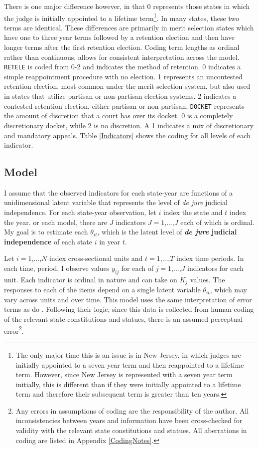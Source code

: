 \documentclass[12pt]{article}
\begin{document}
There is one major difference however, in that 0 represents those states in which the judge is initially appointed to a lifetime term\footnote{The only major time this is an issue is in New Jersey, in which judges are initially appointed to a seven year term and then reappointed to a lifetime term.  However, since New Jersey is represented with a seven year term initially, this is different than if they were initially appointed to a lifetime term and therefore their subsequent term is greater than ten years.}.  In many states, these two terms are identical.  These differences are primarily in merit selection states which have one to three year terms followed by a retention election and then have longer terms after the first retention election.  Coding term lengths as ordinal rather than continuous, allows for consistent interpretation across the model.  \texttt{RETELE} is coded from 0-2 and indicates the method of retention.  0 indicates a simple reappointment procedure with no election.  1 represents an uncontested retention election, most common under the merit selection system, but also used in states that utilize partisan or non-partisan election systems.  2 indicates a contested retention election, either partisan or non-partisan.  \texttt{DOCKET} represents the amount of discretion that a court has over its docket.  0 is a completely discretionary docket, while 2 is no discretion.  A 1 indicates a mix of discretionary and mandatory appeals. Table \ref{Indicators} shows the coding for all levels of each indicator. 

\subsection*{Model}
I assume that the observed indicators for each state-year are functions of a unidimensional latent variable that represents the level of \textit{de jure} judicial independence.  For each state-year observation, let $i$ index the state and $t$ index the year.  or each model, there are $J$ indicators $J=1$,...,$J$ each of which is ordinal. My goal is to estimate each $\theta_{it}$, which is the latent level of \textbf{\textit{de jure} judicial independence} of each state $i$ in year $t$.

Let $i=1$,...,$N$ index cross-sectional units and $t=1$,...,$T$ index time periods.  In each time, period, I observe values $y_{ij}$ for each of $j=1$,...,$J$ indicators for each unit.  Each indicator is ordinal in nature and can take on $K_j$ values.  The responses to each of the items depend on a single latent variable $\theta_{it}$, which may vary across units and over time. This model uses the same interpretation of error terms as do \citet[7]{Schnakenberg2014}.  Following their logic, since this data is collected from human coding of the relevant state constitutions and statues, there is an assumed perceptual error\footnote{Any errors in assumptions of coding are the responsibility of the author.  All inconsistencies between years and information have been cross-checked for validity with the relevant state constitutions and statues.  All aberrations in coding are listed in Appendix \ref{CodingNotes}.}.  
\end{document}
